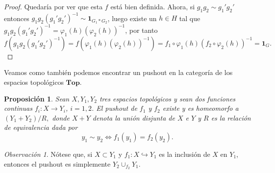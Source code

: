 \documentclass[12pt,a4paper]{book}
\newtheorem{prop}[thm]{Proposición}
\theoremstyle{definition} \newtheorem{defn}[thm]{Definición}
\theoremstyle{definition} \newtheorem{ejemplo}[thm]{Ejemplo}
\theoremstyle{definition} \newtheorem{ejercicio}[thm]{Ejercicio}
\theoremstyle{remark} \newtheorem*{obs}{Observación}
\begin{document}
\begin{proof}
    Quedaría por ver que esta $f$ está bien definida. Ahora, si $g_1g_2 \sim g_1'g_2'$ entonces $g_1g_2(g_1'g_2')^{-1}\sim \mathbf{1}_{G_1*G_2}$, luego existe un $h\in H$ tal que $g_1g_2(g_1'g_2')^{-1}=\varphi_1(h)(\varphi_2(h))^{-1}$, por tanto
    \begin{equation*}
      f(g_1g_2(g_1'g_2')^{-1})=f(\varphi_1(h)(\varphi_2(h))^{-1})=f_1\circ\varphi_1(h)(f_2\circ\varphi_2(h))^{-1}=\mathbf{1}_{G}.
    \end{equation*}
\end{proof}

  Veamos como también podemos encontrar un pushout en la categoría de los espacios topológicos $\mathbf{Top}$.
\begin{prop}  
   Sean $X,Y_1,Y_2$ tres espacios topológicos y sean dos funciones continuas $f_i:X\rightarrow Y_i$, $i=1,2$. El pushout de $f_1$ y $f_2$ existe y es homeomorfo a $
    (Y_1+Y_2)/R,
  $
  donde $X+Y$ denota la unión disjunta de $X$ e $Y$ y $R$ es la relación de equivalencia dada por
  \begin{equation*}
    y_1 \sim y_2 \Leftrightarrow f_1(y_1) = f_2(y_2).
  \end{equation*}
  \end{prop}
  \begin{obs}
    Nótese que, si $X\subset Y_1$ y $f_1:X\hookrightarrow Y_1$ es la inclusión de $X$ en $Y_1$, entonces el pushout es simplemente
$
Y_2\cup_{f_2} Y_1.
  $
\end{obs}
\end{document}
